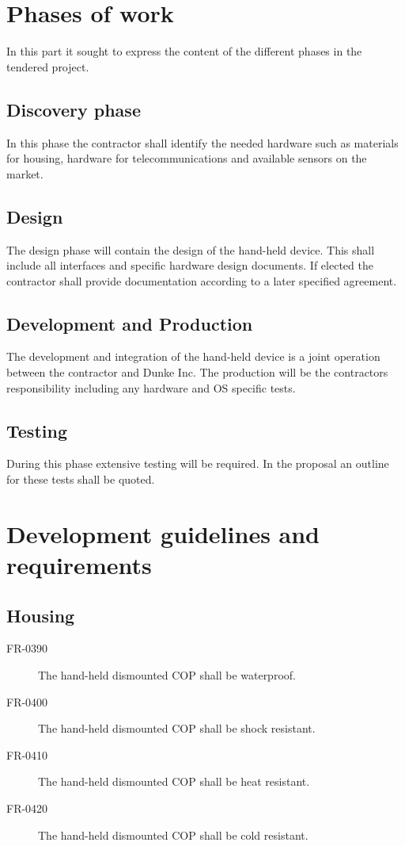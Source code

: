 \section{Phases of work}
In this part it sought to express the content of the different phases in the tendered project. 

\subsection*{Discovery phase}
In this phase the contractor shall identify the needed hardware such as materials for housing, hardware for telecommunications and available sensors on the market. 

\subsection*{Design}
The design phase will contain the design of the hand-held device. This shall include all interfaces and specific hardware design documents. 
If elected the contractor shall provide documentation according to a later specified agreement. 

\subsection*{Development and Production}
The development and integration of the hand-held device is a joint operation between the contractor and Dunke Inc. The production will be the contractors responsibility including any hardware and OS specific tests. 

\subsection*{Testing}
During this phase extensive testing will be required. In the proposal an outline for these tests shall be quoted. 

\section{Development guidelines and requirements}
\subsection{Housing}
\begin{description}
\item[FR-0390] The hand-held dismounted COP shall be waterproof.
\item[FR-0400] The hand-held dismounted COP shall be shock resistant.
\item[FR-0410] The hand-held dismounted COP shall be heat resistant.
\item[FR-0420] The hand-held dismounted COP shall be cold resistant.
\end{description}


